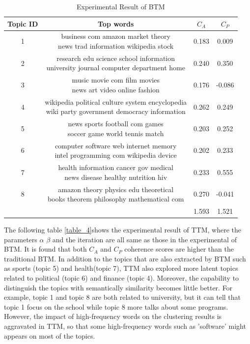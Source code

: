 \begin{table}[htbp]
\centering
\begin{tabular}{|c|c|c|c|}
\hline
Topic ID & Top words & $C_A$ & $C_P$\\
\hline
1 & \tabincell{l}{business com amazon market theory \\news trad information wikipedia stock} & 0.183 & 0.009\\
\hline
2 & \tabincell{l}{research edu science school information \\university journal computer department home} & 0.240 & 0.350\\
\hline
3 &\tabincell{l}{music movie com film movies \\news art video online fashion} & 0.176 & -0.086\\
\hline
4 & \tabincell{l}{wikipedia political culture system encyclopedia \\wiki party government democracy information} & 0.262 & 0.249\\
\hline
5 & \tabincell{l}{news sports football com games \\soccer game world tennis match} & 0.203 & 0.252\\
\hline
6 & \tabincell{l}{computer software web internet memory \\intel programming com wikipedia device} & 0.202 & 0.233\\
\hline
7 & \tabincell{l}{health information cancer gov medical \\news disease healthy nutrition hiv} & 0.233 & 0.555\\
\hline
8 & \tabincell{l}{amazon theory physics edu theoretical \\books theorem philosophy mathematical com} & 0.270 & -0.041\\
\hline
 & & 1.593 & 1.521\\
\hline
\end{tabular}
\caption{Experimental Result of BTM}
\label{table_3}
\end{table}

The following table \ref{table_4}shows the experimental result of TTM, where the parameters $\alpha$ $\beta$ and the iteration are all same as those in the experimental of BTM. It is found that both $C_A$ and $C_P$ coherence scores are higher than the traditional BTM. In addition to the topics that are also extracted by BTM such as sports (topic 5) and health(topic 7), TTM also explored more latent topics related to political (topic 6) and finance (topic 4). Moreover, the capability to distinguish the topics with semantically similarity becomes little better. For example, topic 1 and topic 8 are both related to university, but it can tell that topic 1 focus on the school while topic 8 more talks about some programs. However, the impact of high-frequency words on the clustering results is aggravated in TTM, so that some high-frequency words such as 'software' might appears on most of the topics.

